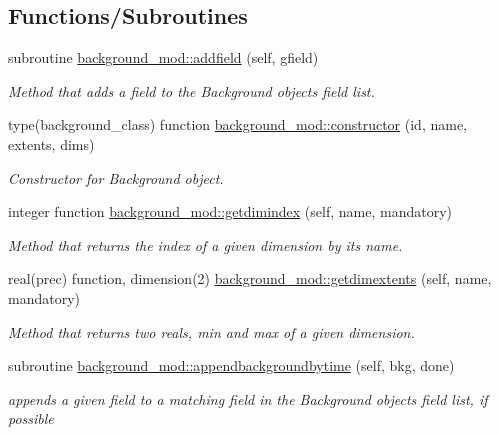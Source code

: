 \subsection*{Functions/\+Subroutines}
\begin{DoxyCompactItemize}
\item 
subroutine \mbox{\hyperlink{namespacebackground__mod_aa6ddc308698724f00ce1177ded5afc4c}{background\+\_\+mod\+::addfield}} (self, gfield)
\begin{DoxyCompactList}\small\item\em Method that adds a field to the Background object\textquotesingle{}s field list. \end{DoxyCompactList}\item 
type(background\+\_\+class) function \mbox{\hyperlink{namespacebackground__mod_ad0096fb6a5a11854fd70a7ce58dc3000}{background\+\_\+mod\+::constructor}} (id, name, extents, dims)
\begin{DoxyCompactList}\small\item\em Constructor for Background object. \end{DoxyCompactList}\item 
integer function \mbox{\hyperlink{namespacebackground__mod_a8a4c5fdcda63376bc3a984e9612dfb63}{background\+\_\+mod\+::getdimindex}} (self, name, mandatory)
\begin{DoxyCompactList}\small\item\em Method that returns the index of a given dimension by it\textquotesingle{}s name. \end{DoxyCompactList}\item 
real(prec) function, dimension(2) \mbox{\hyperlink{namespacebackground__mod_a64c3966a113bc0f3b603c591bc345ca1}{background\+\_\+mod\+::getdimextents}} (self, name, mandatory)
\begin{DoxyCompactList}\small\item\em Method that returns two reals, min and max of a given dimension. \end{DoxyCompactList}\item 
subroutine \mbox{\hyperlink{namespacebackground__mod_a02fa44cb4575159362bfa3b55520d387}{background\+\_\+mod\+::appendbackgroundbytime}} (self, bkg, done)
\begin{DoxyCompactList}\small\item\em appends a given field to a matching field in the Background object\textquotesingle{}s field list, if possible \end{DoxyCompactList}\item 

\end{DoxyCompactItemize}
